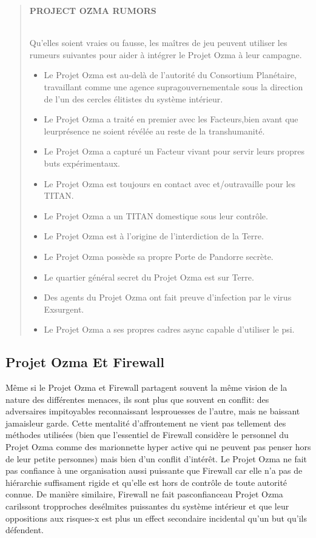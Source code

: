 \begin{quotation} \begin{large} \textbf{PROJECT OZMA RUMORS} \end{large} \\ Qu'elles soient vraies ou fausse, les maîtres de jeu peuvent utiliser les rumeurs suivantes pour aider à intégrer le Projet Ozma à leur campagne. \begin{itemize} \item Le Projet Ozma est au-delà de l'autorité du Consortium Planétaire, travaillant comme une agence supragouvernementale sous la direction de l'un des cercles élitistes du système intérieur. \item Le Projet Ozma a traité en premier avec les Facteurs,bien avant que leurprésence ne soient révélée au reste de la transhumanité. \item Le Projet Ozma a capturé un Facteur vivant pour servir leurs propres buts expérimentaux. \item Le Projet Ozma est toujours en contact avec et/outravaille pour les TITAN. \item Le Projet Ozma a un TITAN domestique sous leur contrôle. \item Le Projet Ozma est à l'origine de l'interdiction de la Terre. \item Le Projet Ozma possède sa propre Porte de Pandorre secrète. \item Le quartier général secret du Projet Ozma est sur Terre. \item Des agents du Projet Ozma ont fait preuve d'infection par le virus Exsurgent. \item Le Projet Ozma a ses propres cadres async capable d'utiliser le psi. \end{itemize} \end{quotation} 

\subsection{Projet Ozma Et Firewall } 

Même si le Projet Ozma et Firewall partagent souvent la même vision de la nature des différentes menaces, ils sont plus que souvent en conflit: des adversaires impitoyables reconnaissant lesprouesses de l'autre, mais ne baissant jamaisleur garde. Cette mentalité d'affrontement ne vient pas tellement des méthodes utilisées (bien que l'essentiel de Firewall considère le personnel du Projet Ozma comme des marionnette hyper active qui ne peuvent pas penser hors de leur petite personnes) mais bien d'un conflit d'intérêt. Le Projet Ozma ne fait pas confiance à une organisation aussi puissante que Firewall car elle n'a pas de hiérarchie suffisament rigide et qu'elle est hors de contrôle de toute autorité connue. De manière similaire, Firewall ne fait pasconfianceau Projet Ozma carilssont tropproches desélmites puissantes du système intérieur et que leur oppositions aux risques-x est plus un effect secondaire incidental qu'un but qu'ils défendent. 

